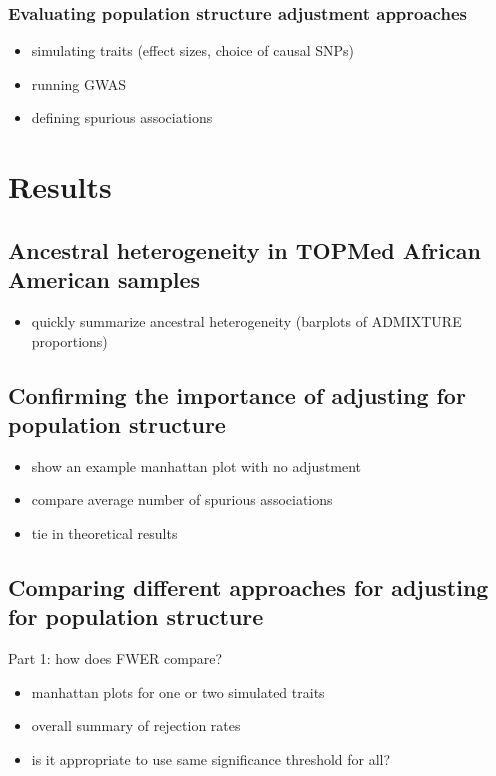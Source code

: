 \documentclass[12pt]{article}
\begin{document}
\subsubsection{Evaluating population structure adjustment approaches}

\begin{itemize}
\item simulating traits (effect sizes, choice of causal SNPs)
\item running GWAS
\item defining spurious associations
\end{itemize}



\section{Results}

\subsection{Ancestral heterogeneity in TOPMed African American samples}

\begin{itemize}
\item quickly summarize ancestral heterogeneity (barplots of ADMIXTURE proportions)
\end{itemize}


\subsection{Confirming the importance of adjusting for population structure}

\begin{itemize}
\item show an example manhattan plot with no adjustment
\item compare average number of spurious associations
\item tie in theoretical results
\end{itemize}

\subsection{Comparing different approaches for adjusting for population structure}

Part 1: how does FWER compare?

\begin{itemize}
\item manhattan plots for one or two simulated traits
\item overall summary of rejection rates
\item is it appropriate to use same significance threshold for all?
\end{itemize}
\end{document}
